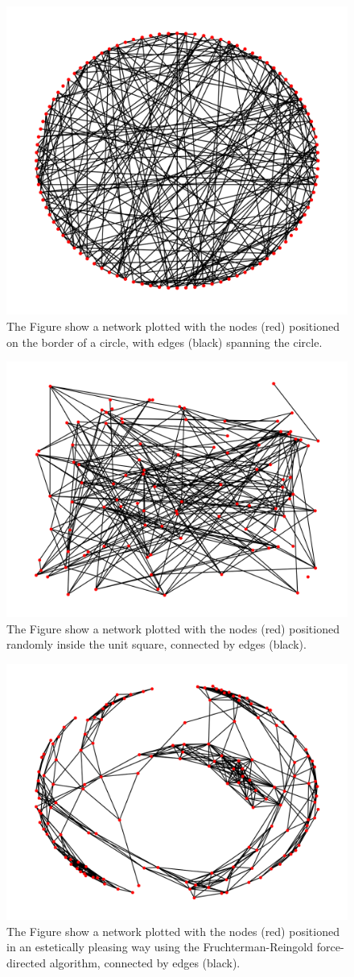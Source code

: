 \documentclass[12pt]{ieeeconf}      %
\begin{document}
\begin{figure}[H]
  \begin{center}
   \includegraphics[width=.5\textwidth]{figures/network-circular}
    \caption{The Figure show a network plotted with the nodes (red) positioned on the border of a circle, with edges (black) spanning the circle.}
    \label{network:circular}
  \end{center}
\end{figure} 

\begin{figure}[H]
  \begin{center}
   \includegraphics[width=.5\textwidth]{figures/network-random}
    \caption{The Figure show a network plotted with the nodes (red) positioned randomly inside the unit square, connected by edges (black).}
    \label{network:random}
  \end{center}
\end{figure} 

\begin{figure}[H]
  \begin{center}
   \includegraphics[width=.5\textwidth]{figures/network-spring}
    \caption{The Figure show a network plotted with the nodes (red) positioned in an estetically pleasing way using the Fruchterman-Reingold force-directed algorithm, connected by edges (black).}
    \label{network:spring}
  \end{center}
\end{figure} 
\end{document}
